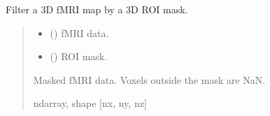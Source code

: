 \documentclass[letterpaper,10pt,english]{sphinxhowto}
\begin{document}

\begin{fulllineitems}
\label{\detokenize{stuff:neurora.stuff.datamask}}
\pysigstartsignatures
{}
\pysigstopsignatures
\sphinxAtStartPar
Filter a 3\sphinxhyphen{}D fMRI map by a 3\sphinxhyphen{}D ROI mask.
\begin{quote}\begin{description}
\begin{itemize}
\item {} 
\sphinxAtStartPar
{} (\sphinxstyleliteralemphasis{\sphinxupquote{, }}\sphinxstyleliteralemphasis{\sphinxupquote{ {[}}}\sphinxstyleliteralemphasis{\sphinxupquote{, }}\sphinxstyleliteralemphasis{\sphinxupquote{, }}\sphinxstyleliteralemphasis{\sphinxupquote{{]}}}) \textendash{} fMRI data.

\item {} 
\sphinxAtStartPar
{} (\sphinxstyleliteralemphasis{\sphinxupquote{, }}\sphinxstyleliteralemphasis{\sphinxupquote{ {[}}}\sphinxstyleliteralemphasis{\sphinxupquote{, }}\sphinxstyleliteralemphasis{\sphinxupquote{, }}\sphinxstyleliteralemphasis{\sphinxupquote{{]}}}) \textendash{} ROI mask.

\end{itemize}

\sphinxAtStartPar
{} \textendash{} Masked fMRI data. Voxels outside the mask are NaN.

\sphinxAtStartPar
ndarray, shape {[}nx, ny, nz{]}

\end{description}\end{quote}

\end{fulllineitems}
\end{document}
